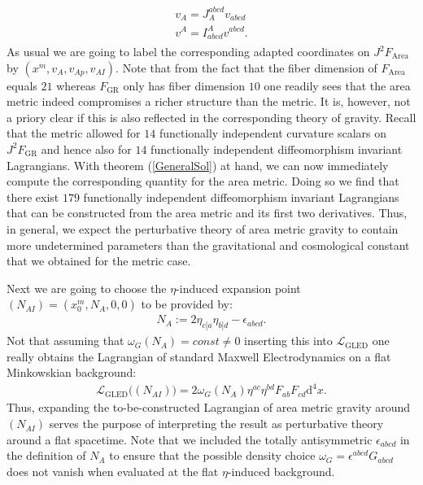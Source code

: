 \begin{align}
    \begin{aligned}
    v_A = J_A^{abcd}v_{abcd} \\
    v^A = I^A_{abcd}v^{abcd}.
    \end{aligned}
\end{align}
As usual we are going to label the corresponding adapted coordinates on $J^2F_{\text{Area}}$ by $(x^m,v_A,v_{Ap},v_{AI})$. 
Note that from the fact that the fiber dimension of $F_{\text{Area}}$ equals $21$ whereas $F_{\text{GR}}$ only has fiber dimension $10$ one readily sees that the area metric indeed compromises a richer structure than the metric. It is, however, not a priory clear if this is also reflected in the corresponding theory of gravity. Recall that the metric allowed for $14$ functionally independent curvature scalars on $J^2F_{\text{GR}}$ and hence also for $14$ functionally independent diffeomorphism invariant Lagrangians. With theorem (\ref{GeneralSol}) at hand, we can now immediately compute the corresponding quantity for the area metric. Doing so we find that there exist $179$ functionally independent diffeomorphism invariant Lagrangians that can be constructed from the area metric and its first two derivatives. Thus, in general, we expect the perturbative theory of area metric gravity to contain more undetermined parameters than the gravitational and cosmological constant that we obtained for the metric case.


Next we are going to choose the $\eta$-induced expansion point $(N_{AI}) = (x_0^m, N_A, 0,0)$ to be provided by:
\begin{align}
N_A := 2 \eta_{c[a} \eta_{b]d} - \epsilon_{abcd}.
\end{align}
Not that assuming that $\omega_G(N_A) = const \neq 0$ inserting this into $\mathcal{L}_{\text{GLED}}$ one really obtains the Lagrangian of standard Maxwell Electrodynamics on a flat Minkowskian background:
\begin{align}
    \mathcal{L}_{\text{GLED}}\bigl((N_{AI})\bigr ) = 2 \omega_G(N_A) \eta^{ac}\eta^{bd}F_{ab}F_{cd} \mathrm{d}^4x.
\end{align}
Thus, expanding the to-be-constructed Lagrangian of area metric gravity around $(N_{AI})$ serves the purpose of interpreting the result as perturbative theory around a flat spacetime. Note that we included the totally antisymmetric $\epsilon_{abcd}$ in the definition of $N_A$ to ensure that  the possible density choice $\omega_G = \epsilon^{abcd}G_{abcd}$ does not vanish when evaluated at the flat $\eta$-induced background. 

